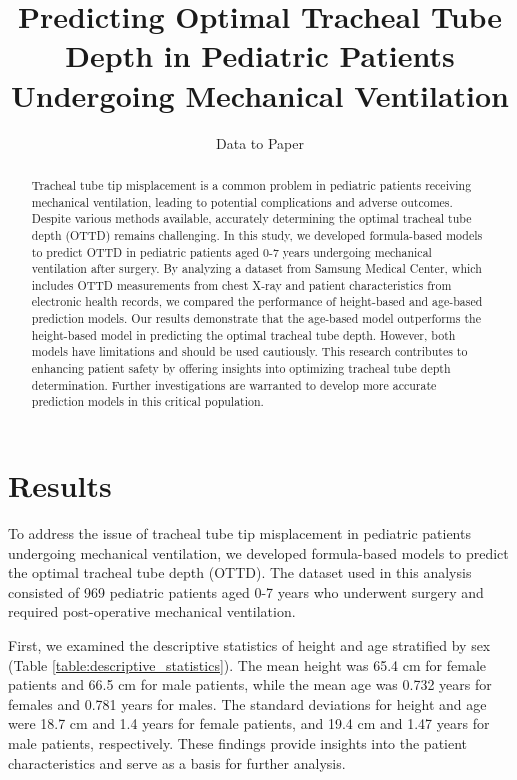 \documentclass[11pt]{article}
\title{Predicting Optimal Tracheal Tube Depth in Pediatric Patients Undergoing Mechanical Ventilation}
\author{Data to Paper}
\begin{document}
\maketitle
\begin{abstract}
Tracheal tube tip misplacement is a common problem in pediatric patients receiving mechanical ventilation, leading to potential complications and adverse outcomes. Despite various methods available, accurately determining the optimal tracheal tube depth (OTTD) remains challenging. In this study, we developed formula-based models to predict OTTD in pediatric patients aged 0-7 years undergoing mechanical ventilation after surgery. By analyzing a dataset from Samsung Medical Center, which includes OTTD measurements from chest X-ray and patient characteristics from electronic health records, we compared the performance of height-based and age-based prediction models. Our results demonstrate that the age-based model outperforms the height-based model in predicting the optimal tracheal tube depth. However, both models have limitations and should be used cautiously. This research contributes to enhancing patient safety by offering insights into optimizing tracheal tube depth determination. Further investigations are warranted to develop more accurate prediction models in this critical population.
\end{abstract}
\section*{Results}

To address the issue of tracheal tube tip misplacement in pediatric patients undergoing mechanical ventilation, we developed formula-based models to predict the optimal tracheal tube depth (OTTD). The dataset used in this analysis consisted of 969 pediatric patients aged 0-7 years who underwent surgery and required post-operative mechanical ventilation. 

First, we examined the descriptive statistics of height and age stratified by sex (Table \ref{table:descriptive_statistics}). The mean height was 65.4 cm for female patients and 66.5 cm for male patients, while the mean age was 0.732 years for females and 0.781 years for males. The standard deviations for height and age were 18.7 cm and 1.4 years for female patients, and 19.4 cm and 1.47 years for male patients, respectively. These findings provide insights into the patient characteristics and serve as a basis for further analysis.
\end{document}
